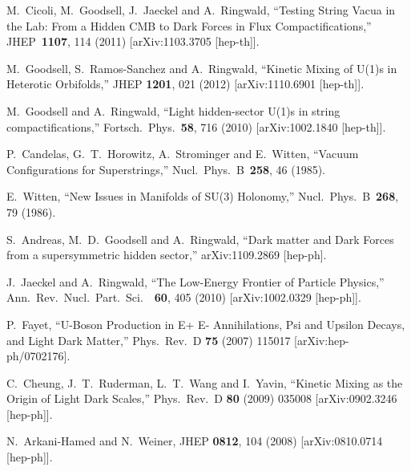  
  M.~Cicoli, M.~Goodsell, J.~Jaeckel and A.~Ringwald,
  ``Testing String Vacua in the Lab: From a Hidden CMB to Dark Forces in Flux Compactifications,''
  JHEP\ {\bf 1107}, 114  (2011)
  [arXiv:1103.3705 [hep-th]].

 M.~Goodsell, S.~Ramos-Sanchez and A.~Ringwald,
 ``Kinetic Mixing of U(1)s in Heterotic Orbifolds,''
 JHEP {\bf 1201}, 021 (2012)
 [arXiv:1110.6901 [hep-th]].

  M.~Goodsell and A.~Ringwald,
  ``Light hidden-sector U(1)s in string compactifications,''
  Fortsch.\ Phys.\  {\bf 58}, 716 (2010)
  [arXiv:1002.1840 [hep-th]].
 
  P.~Candelas, G.~T.~Horowitz, A.~Strominger and E.~Witten,
  ``Vacuum Configurations for Superstrings,''
  Nucl.\ Phys.\ B\ {\bf 258}, 46  (1985).

  E.~Witten,
  ``New Issues in Manifolds of SU(3) Holonomy,''
  Nucl.\ Phys.\ B\ {\bf 268}, 79  (1986).

 S.~Andreas, M.~D.~Goodsell and A.~Ringwald,
 ``Dark matter and Dark Forces from a supersymmetric hidden sector,''
 arXiv:1109.2869 [hep-ph].

  J.~Jaeckel and A.~Ringwald,
  ``The Low-Energy Frontier of Particle Physics,''
  Ann.\ Rev.\ Nucl.\ Part.\ Sci.\ \ {\bf 60}, 405  (2010)
  [arXiv:1002.0329 [hep-ph]].

P.~Fayet,
``U-Boson Production in E+ E- Annihilations, Psi and Upsilon Decays, and Light Dark Matter,''
Phys.\ Rev.\ D {\bf 75} (2007) 115017
[arXiv:hep-ph/0702176].

C.~Cheung, J.~T.~Ruderman, L.~T.~Wang and I.~Yavin,
``Kinetic Mixing as the Origin of Light Dark Scales,''
Phys.\ Rev.\ D {\bf 80} (2009) 035008
[arXiv:0902.3246 [hep-ph]].

  N.~Arkani-Hamed and N.~Weiner,
  JHEP {\bf 0812}, 104 (2008)
  [arXiv:0810.0714 [hep-ph]].

